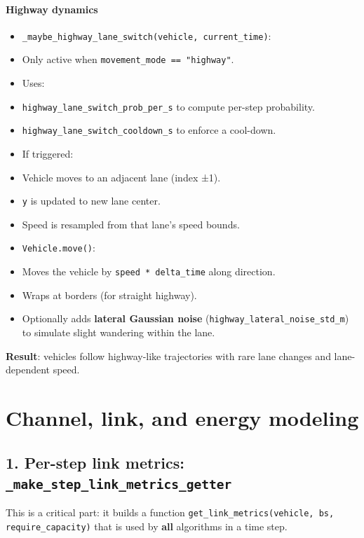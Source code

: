 \documentclass[conference]{IEEEtran}
\begin{document}
\paragraph*{Highway dynamics}
\begin{itemize}
\item \texttt{\_maybe\_highway\_lane\_switch(vehicle, current\_time)}:
\item Only active when \texttt{movement\_mode == "highway"}.
\item Uses:
\item \texttt{highway\_lane\_switch\_prob\_per\_s} to compute per-step probability.
\item \texttt{highway\_lane\_switch\_cooldown\_s} to enforce a cool-down.
\item If triggered:
\item Vehicle moves to an adjacent lane (index ±1).
\item \texttt{y} is updated to new lane center.
\item Speed is resampled from that lane’s speed bounds.
\item \texttt{Vehicle.move()}:
\item Moves the vehicle by \texttt{speed * delta\_time} along direction.
\item Wraps at borders (for straight highway).
\item Optionally adds \textbf{lateral Gaussian noise} (\texttt{highway\_lateral\_noise\_std\_m}) to simulate slight wandering within the lane.
\end{itemize}

\textbf{Result}: vehicles follow highway-like trajectories with rare lane changes and lane-dependent speed.



\section{Channel, link, and energy modeling}

\subsection{1. Per-step link metrics: \texttt{_make_step_link_metrics_getter}}

This is a critical part: it builds a function \texttt{get\_link\_metrics(vehicle, bs, require\_capacity)} that is used by \textbf{all} algorithms in a time step.
\end{document}
